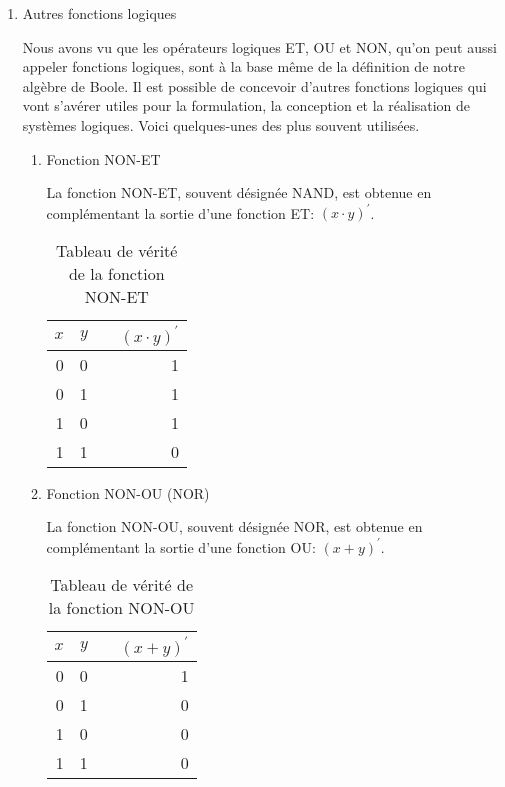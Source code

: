 \documentclass[letter, oneside]{book}
\begin{document}
\begin{enumerate}
\item Autres fonctions logiques
\label{sec:orgb099971}

Nous avons vu que les opérateurs logiques ET, OU et NON, qu'on peut
aussi appeler fonctions logiques, sont à la base même de la définition
de notre algèbre de Boole. Il est possible de concevoir d'autres
fonctions logiques qui vont s'avérer utiles pour la formulation, la
conception et la réalisation de systèmes logiques. Voici quelques-unes
des plus souvent utilisées.

\begin{enumerate}
\item Fonction NON-ET
\label{sec:org39a2b1e}

La fonction NON-ET, souvent désignée NAND, est obtenue en
complémentant la sortie d'une fonction ET: \((x \cdot y)^\prime\).

\begin{table}[htbp]
\caption{\label{tab:org995f2d3}Tableau de vérité de la fonction NON-ET}
\centering
\begin{tabular}{rrlr}
\(x\) & \(y\) &  & \((x \cdot y)^\prime\)\\[0pt]
\hline
0 & 0 &  & 1\\[0pt]
0 & 1 &  & 1\\[0pt]
1 & 0 &  & 1\\[0pt]
1 & 1 &  & 0\\[0pt]
\end{tabular}
\end{table}

\item Fonction NON-OU (NOR)
\label{sec:org572428d}

La fonction NON-OU, souvent désignée NOR, est obtenue en complémentant
la sortie d'une fonction OU: \((x + y)^\prime\).

\begin{table}[htbp]
\caption{\label{tab:org10d4f06}Tableau de vérité de la fonction NON-OU}
\centering
\begin{tabular}{rrlr}
\(x\) & \(y\) &  & \((x + y)^\prime\)\\[0pt]
\hline
0 & 0 &  & 1\\[0pt]
0 & 1 &  & 0\\[0pt]
1 & 0 &  & 0\\[0pt]
1 & 1 &  & 0\\[0pt]
\end{tabular}
\end{table}


\end{enumerate}
\end{enumerate}
\end{document}
